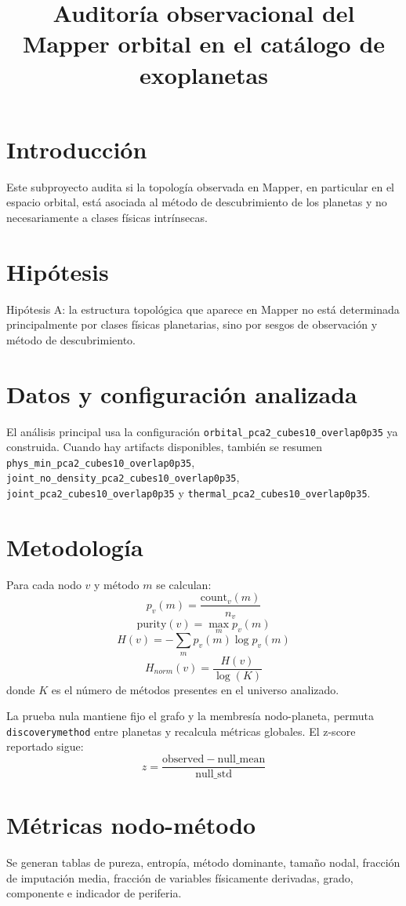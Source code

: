 \documentclass[11pt]{article}
\title{Auditor\'ia observacional del Mapper orbital en el cat\'alogo de exoplanetas}
\date{}
\begin{document}
\maketitle

\section{Introducci\'on}
Este subproyecto audita si la topolog\'ia observada en Mapper, en particular en el espacio orbital, est\'a asociada al m\'etodo de descubrimiento de los planetas y no necesariamente a clases f\'isicas intr\'insecas.

\section{Hip\'otesis}
Hip\'otesis A: la estructura topol\'ogica que aparece en Mapper no est\'a determinada principalmente por clases f\'isicas planetarias, sino por sesgos de observaci\'on y m\'etodo de descubrimiento.

\section{Datos y configuraci\'on analizada}
El an\'alisis principal usa la configuraci\'on \texttt{orbital\_pca2\_cubes10\_overlap0p35} ya construida. Cuando hay artifacts disponibles, tambi\'en se resumen \texttt{phys\_min\_pca2\_cubes10\_overlap0p35}, \texttt{joint\_no\_density\_pca2\_cubes10\_overlap0p35}, \texttt{joint\_pca2\_cubes10\_overlap0p35} y \texttt{thermal\_pca2\_cubes10\_overlap0p35}.

\section{Metodolog\'ia}
Para cada nodo $v$ y m\'etodo $m$ se calculan:
\[
p_v(m) = \frac{\mathrm{count}_v(m)}{n_v}
\]
\[
\mathrm{purity}(v) = \max_m p_v(m)
\]
\[
H(v) = -\sum_m p_v(m) \log p_v(m)
\]
\[
H_{norm}(v) = \frac{H(v)}{\log(K)}
\]
donde $K$ es el n\'umero de m\'etodos presentes en el universo analizado.

La prueba nula mantiene fijo el grafo y la membres\'ia nodo-planeta, permuta \texttt{discoverymethod} entre planetas y recalcula m\'etricas globales. El z-score reportado sigue:
\[
z = \frac{\mathrm{observed} - \mathrm{null\_mean}}{\mathrm{null\_std}}
\]

\section{M\'etricas nodo-m\'etodo}
Se generan tablas de pureza, entrop\'ia, m\'etodo dominante, tama\~no nodal, fracci\'on de imputaci\'on media, fracci\'on de variables f\'isicamente derivadas, grado, componente e indicador de periferia.
\end{document}
